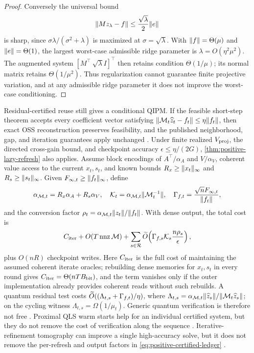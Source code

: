 \begin{proof}
Conversely the universal
bound
\begin{equation}
 \lVert Mz_\lambda-f\rVert\leq \frac{\sqrt\lambda}{2}\lVert e\rVert          \label{eq:positive-prox-residual}
\end{equation}
is sharp, since $\sigma\lambda/(\sigma^2+\lambda)$ is maximized at
$\sigma=\sqrt\lambda$.  With $\lVert f\rVert=\Theta(\mu)$ and $\lVert e\rVert=\Theta(1)$,
the largest worst-case admissible ridge parameter is
$\lambda=O(\eta^2\mu^2)$.  The augmented system
$[M^\top\ \sqrt\lambda I]^\top$ then retains condition $\Theta(1/\mu)$; its normal
matrix retains $\Theta(1/\mu^2)$.  Thus regularization cannot guarantee finite
projective variation, and at any admissible ridge parameter it does not improve
the worst-case conditioning.
\end{proof}

Residual-certified reuse still gives a conditional QIPM.  If the feasible
short-step theorem accepts every coefficient vector satisfying
$\lVert\mathcal M_t\widehat z_t-f_t\rVert\leq\eta\lVert f_t\rVert$, then exact OSS
reconstruction preserves feasibility, and the published neighborhood, gap, and
iteration guarantees apply unchanged
\cite{mohammadisiahroudi2025-inexact-feasible-interior-point-method}.  Under
finite realized $V_{\rm proj}$, the directed cross-gain bound, and checkpoint
accuracy $\epsilon\leq\eta/(2G)$, \cref{thm:positive-lazy-refresh} also applies.
Assume block encodings of $A^\top/\alpha_A$ and $V/\alpha_V$, coherent value
access to the current $x_t,s_t$, and known bounds
$R_x\geq\lVert x_t\rVert_\infty$ and $R_s\geq\lVert s_t\rVert_\infty$.  Given
$F_{\infty,t}\geq\lVert f_t\rVert_\infty$, define
\[
 \alpha_{\mathcal M,t}=R_x\alpha_A+R_s\alpha_V,\quad
 \mathcal K_t=\alpha_{\mathcal M,t}\lVert\mathcal M_t^{-1}\rVert,\quad
 \Gamma_{f,t}=\frac{\sqrt n F_{\infty,t}}{\lVert f_t\rVert},
\]
and the conversion factor
$\rho_t=\alpha_{\mathcal M,t}\lVert z_t\rVert/\lVert f_t\rVert$.  With dense output, the
total cost is
\begin{equation}
 C_{\rm iter}+O(T\operatorname{nnz}\mathcal M)+
 \sum_{s\in\mathcal R}\widetilde{O}\!\left(
  \Gamma_{f,s}\mathcal K_s\frac{n\rho_s}{\epsilon}\right),     \label{eq:positive-certified-ledger}
\end{equation}
plus $O(nR)$ checkpoint writes.  Here $C_{\rm iter}$ is the full cost of
maintaining the assumed coherent iterate oracles; rebuilding dense memories for
$x_t,s_t$ in every round gives $C_{\rm iter}=\Theta(nTB_{\rm bit})$, and the
term vanishes only if the outer implementation already provides coherent reads
without such rebuilds.
A quantum residual test costs
$\widetilde{O}((\Lambda_{t,s}+\Gamma_{f,t})/\eta)$, where
$\Lambda_{t,s}=\alpha_{\mathcal M,t}\lVert\widehat z_s\rVert/
\lVert\mathcal M_t\widehat z_s\rVert$; on the cycling witness
$\Lambda_{t,s}=\Omega(1/\mu_t)$.  Generic quantum verification is therefore
not free \cite{rolando2021-complexity-quantum-state-verification-quantum}.
Proximal QLS warm starts help for an individual certified system, but they do
not remove the cost of verification along the sequence \cite{kim2026-catalyst-framework-problem-proximal-point}.
Iterative-refinement tomography can improve a single high-accuracy solve, but
it does not remove the per-refresh and output factors in
\eqref{eq:positive-certified-ledger}
\cite{mohammadisiahroudi2023-exponentially-more-precise-tomography-for}.

